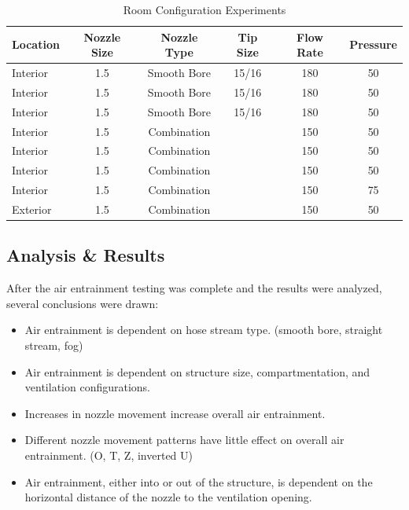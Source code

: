 \documentclass{article}
\begin{document}
\begin{table}[!ht]
\centering
\caption{Room Configuration Experiments}
\label{Room_Configuration_Experiments}
\begin{tabular}{lccccc}
\toprule[1.5pt]
Location & Nozzle Size & Nozzle Type & Tip Size & Flow Rate & Pressure \\ 
\midrule
Interior & 1.5 & Smooth Bore & 15/16 & 180 & 50 \\
Interior & 1.5 & Smooth Bore & 15/16 & 180 & 50 \\
Interior & 1.5 & Smooth Bore & 15/16 & 180 & 50 \\
Interior & 1.5 & Combination &  & 150 & 50 \\
Interior & 1.5 & Combination &  & 150 & 50 \\
Interior & 1.5 & Combination &  & 150 & 50 \\
Interior & 1.5 & Combination &  & 150 & 75 \\
Exterior & 1.5 & Combination &  & 150 & 50 \\ 
\bottomrule[1.25pt]
\end{tabular}
\end{table}

\clearpage

\subsection{Analysis \& Results}

\vspace*{\baselineskip}

After the air entrainment testing was complete and the results were analyzed, several conclusions were drawn:

\begin{itemize}
	\item Air entrainment is dependent on hose stream type. (smooth bore, straight stream, fog)
	\item Air entrainment is dependent on structure size, compartmentation, and ventilation configurations.
	\item Increases in nozzle movement increase overall air entrainment.
	\item Different nozzle movement patterns have little effect on overall air entrainment. (O, T, Z, inverted U)
	\item Air entrainment, either into or out of the structure, is dependent on the horizontal distance of the nozzle to the ventilation opening.
\end{itemize}
\end{document}
